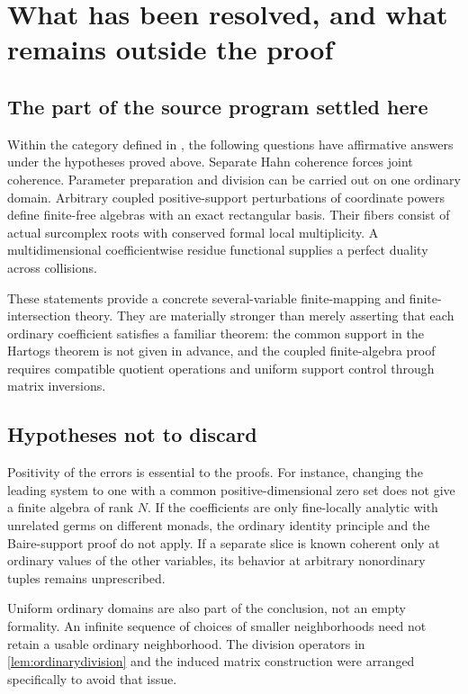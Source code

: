\documentclass[11pt,oneside]{article}
\numberwithin{equation}{section}
\theoremstyle{definition}
\theoremstyle{remark}\newtheorem{remark}[theorem]{Remark}
\begin{document}
\section{What has been resolved, and what remains outside the proof}\label{sec:limits}
\subsection{The part of the source program settled here}
Within the category defined in \cite{Source}, the following questions have affirmative answers under the hypotheses proved above. Separate Hahn coherence forces joint coherence. Parameter preparation and division can be carried out on one ordinary domain. Arbitrary coupled positive-support perturbations of coordinate powers define finite-free algebras with an exact rectangular basis. Their fibers consist of actual surcomplex roots with conserved formal local multiplicity. A multidimensional coefficientwise residue functional supplies a perfect duality across collisions.

These statements provide a concrete several-variable finite-mapping and finite-intersection theory. They are materially stronger than merely asserting that each ordinary coefficient satisfies a familiar theorem: the common support in the Hartogs theorem is not given in advance, and the coupled finite-algebra proof requires compatible quotient operations and uniform support control through matrix inversions.

\subsection{Hypotheses not to discard}
Positivity of the errors is essential to the proofs. For instance, changing the leading system to one with a common positive-dimensional zero set does not give a finite algebra of rank \(N\). If the coefficients are only fine-locally analytic with unrelated germs on different monads, the ordinary identity principle and the Baire-support proof do not apply. If a separate slice is known coherent only at ordinary values of the other variables, its behavior at arbitrary nonordinary tuples remains unprescribed.

Uniform ordinary domains are also part of the conclusion, not an empty formality. An infinite sequence of choices of smaller neighborhoods need not retain a usable ordinary neighborhood. The division operators in \cref{lem:ordinarydivision} and the induced matrix construction were arranged specifically to avoid that issue.
\end{document}
